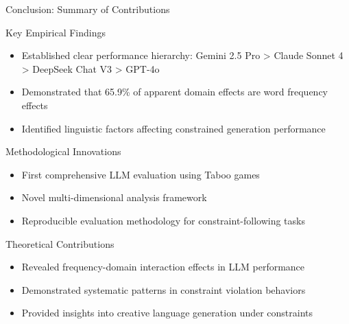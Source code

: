 \documentclass[aspectratio=169]{beamer}
\begin{document}
\begin{frame}{Conclusion: Summary of Contributions}
\begin{block}{Key Empirical Findings}
\begin{itemize}
    \item Established clear performance hierarchy: Gemini 2.5 Pro > Claude Sonnet 4 > DeepSeek Chat V3 > GPT-4o
    \item Demonstrated that 65.9\% of apparent domain effects are word frequency effects
    \item Identified linguistic factors affecting constrained generation performance
\end{itemize}
\end{block}

\begin{block}{Methodological Innovations}
\begin{itemize}
    \item First comprehensive LLM evaluation using Taboo games
    \item Novel multi-dimensional analysis framework
    \item Reproducible evaluation methodology for constraint-following tasks
\end{itemize}
\end{block}

\begin{block}{Theoretical Contributions}
\begin{itemize}
    \item Revealed frequency-domain interaction effects in LLM performance
    \item Demonstrated systematic patterns in constraint violation behaviors
    \item Provided insights into creative language generation under constraints
\end{itemize}
\end{block}
\end{frame}
\end{document}
